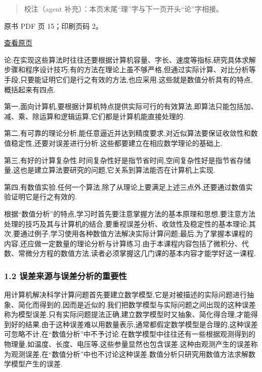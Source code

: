 \begin{quote}
校注（agent 补充）：本页末尾``理''字与下一页开头``论''字相接。
\end{quote}

\clearpage

原书 PDF 页 15；印刷页码 2。

\href{source-images/pdf-015.jpeg}{查看原页}

论;在实现这些算法时往往还要根据计算机容量、字长、速度等指标,研究具体求解步骤和程序设计技巧;有的方法在理论上虽不够严格,但通过实际计算、对比分析等手段,只要能证明它们是行之有效的方法,也应采用.这些就是数值分析具有的特点,概括起来有四点.

第一,面向计算机,要根据计算机特点提供实际可行的有效算法,即算法只能包括加、减、乘、除运算和逻辑运算,它们都是计算机能直接处理的.

第二,有可靠的理论分析,能任意逼近并达到精度要求,对近似算法要保证收敛性和数值稳定性,还要对误差进行分析.这些都要建立在相应数学理论的基础上.

第三,有好的计算复杂性.时间复杂性好是指节省时间,空间复杂性好是指节省存储量,这也是建立算法要研究的问题,它关系到算法能否在计算机上实现.

第四,有数值实验.任何一个算法,除了从理论上要满足上述三点外,还要通过数值实验证明它是行之有效的.

根据``数值分析''的特点,学习时首先要注意掌握方法的基本原理和思想,要注意方法处理的技巧及其与计算机的结合,要重视误差分析、收敛性及稳定性的基本理论;其次,要通过例子,学习使用各种数值方法解决实际计算问题;最后,为了掌握本课程的内容,还应做一定数量的理论分析与计算练习.由于本课程内容包括了微积分、代数、常微分方程的数值方法,读者必须掌握这几门课的基本内容才能学好这一课程.

\subsubsection{1.2 误差来源与误差分析的重要性}\label{ch01-ux8befux5deeux6765ux6e90ux4e0eux8befux5deeux5206ux6790ux7684ux91cdux8981ux6027}

用计算机解决科学计算问题首先要建立数学模型,它是对被描述的实际问题进行抽象、简化而得到的,因而是近似的.我们把数学模型与实际问题之间出现的这种误差称为模型误差.只有实际问题提法正确,建立数学模型时又抽象、简化得合理,才能得到好的结果.由于这种误差难以用数量表示,通常都假定数学模型是合理的,这种误差可忽略不计,在``数值分析''中不予讨论.在数学模型中往往还有一些根据观测得到的物理量,如温度、长度、电压等,这些参量显然也包含误差.这种由观测产生的误差称为观测误差,在``数值分析''中也不讨论这种误差.数值分析只研究用数值方法求解数学模型产生的误差.

